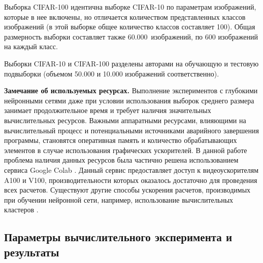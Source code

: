 Выборка CIFAR-100 идентична выборке CIFAR-10 по параметрам изображений, которые в нее включены, но отличается количеством представленных классов изображений (в этой выборке общее количество классов составляет 100). Общая размерность выборки составляет также 60.000~изображений, по 600 изображений на каждый класс.

Выборки CIFAR-10 и CIFAR-100 разделены авторами на обучающую и тестовую подвыборки (объемом 50.000 и 10.000 изображений соответственно).


\textbf{Замечание об используемых ресурсах.} Выполнение экспериментов с глубокими нейронными сетями даже при условии использования выборок среднего размера занимает продолжительное время и требует наличия значительных вычислительных ресурсов. Важными аппаратными ресурсами, влияющими на вычислительный процесс и потенциальными источниками аварийного завершения программы, становятся оперативная память и количество обрабатывающих элементов в случае использования графических ускорителей. В данной работе проблема наличия данных ресурсов была частично решена использованием сервиса Google Colab \cite{googlecolab}. Данный сервис предоставляет доступ к видеоускорителям A100 и V100, производительности которых оказалось достаточно для проведения всех расчетов. Существуют другие способы ускорения расчетов, производимых при обучении нейронной сети, например, использование вычислительных кластеров \cite[c.~701]{n16}. %

\subsection{Параметры вычислительного эксперимента и результаты}

